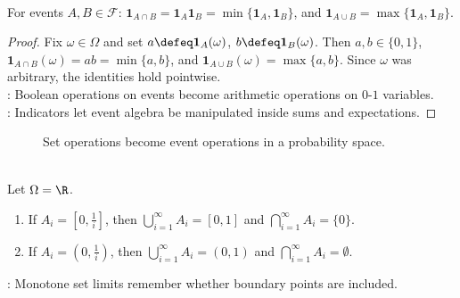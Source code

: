 \begin{proposition} \label{prop:indicator-event-algebra} \\
For events $A,B\in\mathcal{F}$: $\mathbf{1}_{A\cap B}=\mathbf{1}_A\mathbf{1}_B=\min\{\mathbf{1}_A,\mathbf{1}_B\}$, and $\mathbf{1}_{A\cup B}=\max\{\mathbf{1}_A,\mathbf{1}_B\}$.
\begin{proof}
Fix $\omega\in\Omega$ and set $a\defeq\mathbf{1}_A(\omega)$, $b\defeq\mathbf{1}_B(\omega)$. Then $a,b\in\{0,1\}$, $\mathbf{1}_{A\cap B}(\omega)=ab=\min\{a,b\}$, and $\mathbf{1}_{A\cup B}(\omega)=\max\{a,b\}$. Since $\omega$ was arbitrary, the identities hold pointwise.\\
: Boolean operations on events become arithmetic operations on $0$-$1$ variables.\\
: Indicators let event algebra be manipulated inside sums and expectations.
\end{proof}
\end{proposition}

\begin{figure}[H]
  \centering
  
  \caption{Set operations become event operations in a probability space.}
  \label{fig:venn-union-intersection-probability}
\end{figure}

\begin{example} \label{ex:monotone-event-limits-on-real-line} \\
Let $\Omega=\R$.
\begin{enumerate}[label=(\roman*)]
\setlength{\itemsep}{0pt}
\item If $A_i=[0,\frac{1}{i}]$, then $\bigcup\limits_{i=1}^{\infty}A_i=[0,1]$ and $\bigcap\limits_{i=1}^{\infty}A_i=\{0\}$.
\item If $A_i=(0,\frac{1}{i})$, then $\bigcup\limits_{i=1}^{\infty}A_i=(0,1)$ and $\bigcap\limits_{i=1}^{\infty}A_i=\emptyset$.
\end{enumerate}
: Monotone set limits remember whether boundary points are included.
\end{example}

